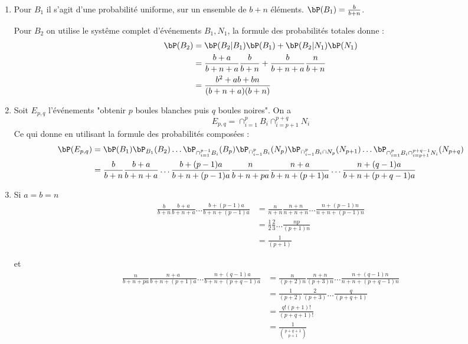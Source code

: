 \begin{correction}
\begin{enumerate}
\item Pour $B_1$ il s'agit d'une probabilité uniforme, sur un ensemble de $b+n$ éléments.  $\bP(B_1) =\frac{b}{b+n}$.

Pour $B_2$ on utilise le systême complet d'événements $B_1, N_1$, la formule des probabilités totales donne : 
\begin{align*}
\bP(B_2) &= \bP(B_2|B_1) \bP(B_1) + \bP(B_2|N_1) \bP(N_1)\\
			&= \frac{b+a}{b+n+a}\frac{b}{b+n}+\frac{b}{b+n+a}\frac{n}{b+n}\\
			&= \frac{b^2+ab +bn }{(b+n+a)(b+n)}
\end{align*}
\item Soit $E_{p,q}$ l'événements "obtenir $p$ boules blanches puis $q$ boules noires".
On a $$E_{p,q} = \cap_{i=1}^p B_i \cap_{i=p+1}^{p+q} N_{i}$$
Ce qui donne en utilisant la formule des probabilités composées :
\begin{align*}
\bP(E_{p,q}) &= \bP(B_1) \bP_{B_1} (B_2) \dots \bP_{\cap_{i=1}^{p-1} B_i} (B_p)  \bP_{\cap_{i=1}^{p} B_i} (N_p)  \bP_{\cap_{i=1}^{p} B_i \cap N_p} (N_{p+1})  \dots  \bP_{\cap_{i=1}^{p}B_i \cap_{i=p+1}^{p+q-1} N_{i}} (N_{p+q}) \\
&= \frac{b}{b+n } \frac{b+a}{b+n+a }  \dots \frac{b+(p-1)a}{b+n +(p-1)a} \frac{n}{b+n+p a }  \frac{n+a}{b+n+(p+1) a }  \dots \frac{n+(q-1)a}{b+n+(p+q-1) a }  \\
\end{align*}
\item Si $a=b=n$
\begin{align*}
\frac{b}{b+n } \frac{b+a}{b+n+a }  \dots \frac{b+(p-1)a}{b+n +(p-1)a}  &=  \frac{n}{n+n } \frac{n+n}{n+n+n }  \dots \frac{n+(p-1)n}{n+n +(p-1)n} \\
&= \frac{1}{2 } \frac{2}{3}  \dots \frac{np}{(p+1)n} \\
&=  \frac{1}{(p+1)} 
\end{align*} 

et 
\begin{align*}
\frac{n}{b+n+p a }  \frac{n+a}{b+n+(p+1) a }  \dots \frac{n+(q-1)a}{b+n+(p+q-1) a }  
&= \frac{n}{(p+2)n }  \frac{n+n}{(p+3)n }  \dots \frac{n+(q-1)n}{n+n+(p+q-1) n } \\
&=\frac{1}{(p+2) }  \frac{2}{(p+3) }  \dots \frac{q}{(p+q+1)  }\\
&= \frac{q! (p+1)!}{(p+q+1)!}\\
&= \frac{1}{\binom{p+q+1}{p+1}}
\end{align*}


\end{enumerate}
\end{correction}
